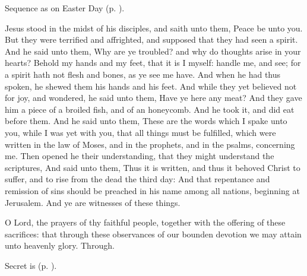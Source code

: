 \begin{rubric}
    Sequence as on Easter Day (p. \pageref{PaschalSequence}).
\end{rubric}

 Jesus stood in the midst of his disciples, and saith unto them, Peace be unto you. But they were terrified and affrighted, and supposed that they had seen a spirit. And he said unto them, Why are ye troubled? and why do thoughts arise in your hearts? Behold my hands and my feet, that it is I myself: handle me, and see; for a spirit hath not flesh and bones, as ye see me have. And when he had thus spoken, he shewed them his hands and his feet. And while they yet believed not for joy, and wondered, he said unto them, Have ye here any meat? And they gave him a piece of a broiled fish, and of an honeycomb. And he took it, and did eat before them. And he said unto them, These are the words which I spake unto you, while I was yet with you, that all things must be fulfilled, which were written in the law of Moses, and in the prophets, and in the psalms, concerning me. Then opened he their understanding, that they might understand the scriptures, And said unto them, Thus it is written, and thus it behoved Christ to suffer, and to rise from the dead the third day: And that repentance and remission of sins should be preached in his name among all nations, beginning at Jerusalem. And ye are witnesses of these things.


\clearpage
\secret
{} O Lord, the prayers of thy faithful people, together with the offering of these sacrifices: that through these observances of our bounden devotion we may attain unto heavenly glory. Through.
\begin{rubric}
     Secret is  (p. \pageref{EasterSecret}).
\end{rubric}


